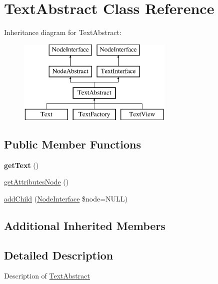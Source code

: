 \hypertarget{class_pes_1_1_dom_1_1_node_1_1_text_1_1_text_abstract}{}\section{Text\+Abstract Class Reference}
\label{class_pes_1_1_dom_1_1_node_1_1_text_1_1_text_abstract}
Inheritance diagram for Text\+Abstract\+:\begin{figure}[H]
\begin{center}
\leavevmode
\includegraphics[height=4.000000cm]{class_pes_1_1_dom_1_1_node_1_1_text_1_1_text_abstract}
\end{center}
\end{figure}
\subsection*{Public Member Functions}
\begin{DoxyCompactItemize}
\item 
\mbox{\label{class_pes_1_1_dom_1_1_node_1_1_text_1_1_text_abstract_a8a2999b1d846c0a7bc77187e28facd99}} 
{\bfseries get\+Text} ()
\item 
\mbox{\hyperlink{class_pes_1_1_dom_1_1_node_1_1_text_1_1_text_abstract_a4722e7722b245351681b05d35f6694f3}{get\+Attributes\+Node}} ()
\item 
\mbox{\hyperlink{class_pes_1_1_dom_1_1_node_1_1_text_1_1_text_abstract_ad351929e79a37854d087f8c02eda0ed6}{add\+Child}} (\mbox{\hyperlink{interface_pes_1_1_dom_1_1_node_1_1_node_interface}{Node\+Interface}} \$node=N\+U\+LL)
\end{DoxyCompactItemize}
\subsection*{Additional Inherited Members}


\subsection{Detailed Description}
Description of \mbox{\hyperlink{class_pes_1_1_dom_1_1_node_1_1_text_1_1_text_abstract}{Text\+Abstract}}

